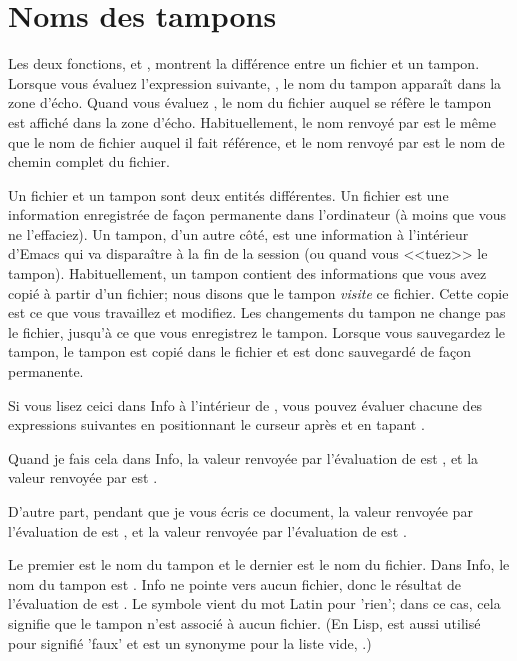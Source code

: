 \section{Noms des tampons}

Les deux fonctions,  et ,
montrent la différence entre un fichier et un tampon. Lorsque vous
évaluez l'expression suivante, , le nom du tampon
apparaît dans la zone d'écho. Quand vous évaluez
, le nom du fichier auquel se réfère le tampon
est affiché dans la zone d'écho. Habituellement, le nom renvoyé par
  est le même que le nom de fichier auquel il fait
référence, et le nom renvoyé par  est le nom de
chemin complet du fichier. 

Un fichier et un tampon sont deux entités différentes. Un fichier est
une information enregistrée de façon permanente dans l'ordinateur (à
moins que vous ne l'effaciez). Un tampon, d'un autre côté, est une
information à l'intérieur d'Emacs qui va disparaître à la fin de la
session (ou quand vous <<tuez>> le tampon). Habituellement, un tampon
contient des informations que vous avez copié à partir d'un fichier;
nous disons que le tampon \textit{visite} ce fichier. Cette copie est
ce que vous travaillez et modifiez. Les changements du tampon ne
change pas le fichier, jusqu'à ce que vous enregistrez le
tampon. Lorsque vous sauvegardez le tampon, le tampon est copié dans
le fichier et est donc sauvegardé de façon permanente.

Si vous lisez ceici dans Info à l'intérieur de \gem , vous pouvez
évaluer chacune des expressions suivantes en positionnant le curseur
après et en tapant . 



Quand je fais cela dans Info, la valeur renvoyée par l'évaluation de
 est , et la valeur renvoyée par
 est .

D'autre part, pendant que je vous écris ce document, la valeur
renvoyée par l'évaluation de  est
, et la valeur renvoyée par l'évaluation
de  est
.

Le premier est le nom du tampon et le dernier est le nom du
fichier. Dans Info, le nom du tampon est . Info ne
pointe vers aucun fichier, donc le résultat de l'évaluation de
 est . Le symbole  vient du mot
Latin pour 'rien'; dans ce cas, cela signifie que le tampon n'est
associé à aucun fichier. (En Lisp,  est aussi utilisé pour
signifié 'faux' et est un synonyme pour la liste vide, \tm{()}.)

